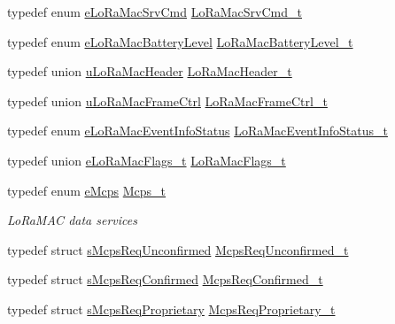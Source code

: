 \begin{DoxyCompactItemize}
\item 
typedef enum \mbox{\hyperlink{group___l_o_r_a_m_a_c_gac91cc4dc69ad7de2426360f9f1f2d079}{e\+Lo\+Ra\+Mac\+Srv\+Cmd}} \mbox{\hyperlink{group___l_o_r_a_m_a_c_gabf2096aa70e466d0403f90200fab17b5}{Lo\+Ra\+Mac\+Srv\+Cmd\+\_\+t}}
\item 
typedef enum \mbox{\hyperlink{group___l_o_r_a_m_a_c_gac7cbd1d9dc906cf2b33e3715cdd426c3}{e\+Lo\+Ra\+Mac\+Battery\+Level}} \mbox{\hyperlink{group___l_o_r_a_m_a_c_ga05ad2aa3ef6de09ab289684a26901f75}{Lo\+Ra\+Mac\+Battery\+Level\+\_\+t}}
\item 
typedef union \mbox{\hyperlink{unionu_lo_ra_mac_header}{u\+Lo\+Ra\+Mac\+Header}} \mbox{\hyperlink{group___l_o_r_a_m_a_c_gaff5f7004a7a48d53d858e26834b53efa}{Lo\+Ra\+Mac\+Header\+\_\+t}}
\item 
typedef union \mbox{\hyperlink{unionu_lo_ra_mac_frame_ctrl}{u\+Lo\+Ra\+Mac\+Frame\+Ctrl}} \mbox{\hyperlink{group___l_o_r_a_m_a_c_ga12b0f3e7e6edd26cfdb9d10a1d873ab7}{Lo\+Ra\+Mac\+Frame\+Ctrl\+\_\+t}}
\item 
typedef enum \mbox{\hyperlink{group___l_o_r_a_m_a_c_ga3c4e7a774e25faf1606f577ee5e7d201}{e\+Lo\+Ra\+Mac\+Event\+Info\+Status}} \mbox{\hyperlink{group___l_o_r_a_m_a_c_gac6ffc346a4c767f7a743c87a686c51b4}{Lo\+Ra\+Mac\+Event\+Info\+Status\+\_\+t}}
\item 
typedef union \mbox{\hyperlink{unione_lo_ra_mac_flags__t}{e\+Lo\+Ra\+Mac\+Flags\+\_\+t}} \mbox{\hyperlink{group___l_o_r_a_m_a_c_ga4044e22ced14e9517d7a21663c577c30}{Lo\+Ra\+Mac\+Flags\+\_\+t}}
\item 
typedef enum \mbox{\hyperlink{group___l_o_r_a_m_a_c_ga7b080a046606f23fe030d0aa6d2a0e30}{e\+Mcps}} \mbox{\hyperlink{group___l_o_r_a_m_a_c_ga670d0c87a52aeb13391f303a4cf94f00}{Mcps\+\_\+t}}
\begin{DoxyCompactList}\small\item\em Lo\+Ra\+M\+AC data services \end{DoxyCompactList}\item 
typedef struct \mbox{\hyperlink{structs_mcps_req_unconfirmed}{s\+Mcps\+Req\+Unconfirmed}} \mbox{\hyperlink{group___l_o_r_a_m_a_c_gaab871b914dfa4013c176586dcc2ea6df}{Mcps\+Req\+Unconfirmed\+\_\+t}}
\item 
typedef struct \mbox{\hyperlink{structs_mcps_req_confirmed}{s\+Mcps\+Req\+Confirmed}} \mbox{\hyperlink{group___l_o_r_a_m_a_c_ga02103c0ee1374a6b1eec217f148ec0e2}{Mcps\+Req\+Confirmed\+\_\+t}}
\item 
typedef struct \mbox{\hyperlink{structs_mcps_req_proprietary}{s\+Mcps\+Req\+Proprietary}} \mbox{\hyperlink{group___l_o_r_a_m_a_c_gac856bc282e89301412e0a294b3e663c4}{Mcps\+Req\+Proprietary\+\_\+t}}

\end{DoxyCompactItemize}
